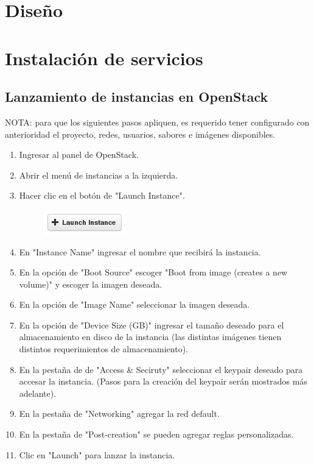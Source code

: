 \documentclass{article}
\begin{document}
\section{Dise\~no}

\section{Instalaci\'on de servicios}
\subsection{Lanzamiento de instancias en OpenStack}
NOTA: para que los siguientes pasos apliquen, es requerido tener configurado con anterioridad el proyecto, redes, usuarios, sabores e im\'agenes disponibles.

\begin{enumerate}
  \item Ingresar al panel de OpenStack.
  \item Abrir el men\'u de instancias a la izquierda.
  \item Hacer clic en el bot\'on de "Launch Instance".
  \begin{figure}[!h]
    \centering
      \includegraphics{images/instances-1.png}
    \label{fig:graph}
  \end{figure}
  \item En "Instance Name" ingresar el nombre que recibir\'a la instancia.
  \item En la opci\'on de "Boot Source" escoger "Boot from image (creates a new volume)" y escoger la imagen deseada.
  \item En la opci\'on de "Image Name" seleccionar la imagen deseada.
  \item En la opci\'on de "Device Size (GB)" ingresar el tama\~no deseado para el almacenamiento en disco de la instancia (las distintas im\'agenes tienen distintos requerimientos de almacenamiento).
  \item En la pesta\~na de de "Access \& Seciruty" seleccionar el keypair deseado para accesar la instancia. (Pasos para la creaci\'on del keypair ser\'an mostrados m\'as adelante).
  \item En la pesta\~na de "Networking" agregar la red default.
  \item En la pesta\~na de "Post-creation" se pueden agregar reglas personalizadas.
  \item Clic en "Launch" para lanzar la instancia.
\end{enumerate}
\end{document}
